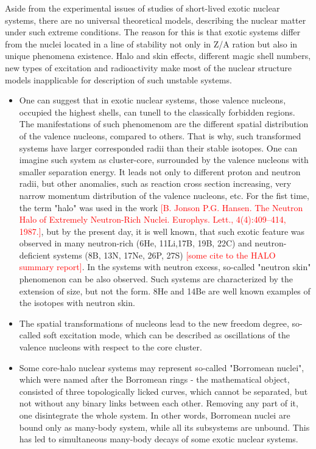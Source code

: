 Aside from the experimental issues of studies of short-lived exotic nuclear systems, there are no universal theoretical models, describing the nuclear matter under such extreme conditions.
The reason for this is that exotic systems differ from the nuclei located in a line of stability not only in Z/A ration but also in unique phenomena existence.
Halo and skin effects, different magic shell numbers, new types of excitation and radioactivity make most of the nuclear structure models inapplicable for description of such unstable systems.

\begin{itemize}
	\item 
	One can suggest that in exotic nuclear systems, those valence nucleons, occupied the highest shells, can tunell to the classically forbidden regions. 
	The manifestations of such phenomenom are the different spatial distribution of the valence nucleons, compared to others. 
	That is why, such transformed systems have larger corresponded radii than their stable isotopes.
	One can imagine such system as cluster-core, surrounded by the valence nucleons with smaller separation energy.
	It leads not only to different proton and neutron radii, but other anomalies, such as reaction cross section increasing, very narrow momentum distribution of the valence nucleons, etc.
	For the fist time, the term "halo" was used in the work \textcolor{red}{[B. Jonson P.G. Hansen. The Neutron Halo of Extremely Neutron-Rich Nuclei. Europhys. Lett., 4(4):409–414, 1987.]}, but by the present day, it is well known, that such exotic feature was observed in many neutron-rich (6He, 11Li,17B, 19B, 22C) and neutron-deficient systems (8B, 13N, 17Ne, 26P, 27S) \textcolor{red}{[some cite to the HALO summary report]}.
	In the systems with neutron excess, so-called "neutron skin" phenomenon can be also observed.
	Such systems are characterized by the extension of size, but not the form. 8He and 14Be are well known examples of the isotopes with neutron skin.
	
	\item 
	The spatial transformations of nucleons lead to the new freedom degree, so-called soft excitation mode, which can be described as oscillations of the valence nucleons with respect to the core cluster. 
	
	\item 
	Some core-halo nuclear systems may represent so-called "Borromean nuclei", which were named after the Borromean rings - the mathematical object, consisted of three topologically licked curves, which cannot be separated, but not without any binary links between each other.
	Removing any part of it, one disintegrate the whole system.
	In other words, Borromean nuclei are bound only as many-body system, while all its subsystems are unbound.
	This has led to simultaneous many-body decays of some exotic nuclear systems.
	

\end{itemize}



